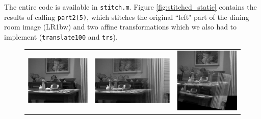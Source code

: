 \documentclass[11pt]{article} %
\begin{document}
The entire code is available in \texttt{stitch.m}. Figure \ref{fig:stitched_static} contains the results of calling \texttt{part2(5)}, which stitches the original ``left" part of the dining room image (LR1bw) and two affine transformations which we also had to implement (\texttt{translate100} and \texttt{trs}).

\begin{figure}[H]
	\centering
	\begin{tabular}{ccc}
		\includegraphics[scale=.4]{LR1bw.png} &
		\includegraphics[scale=.4]{figures/tr100stitching} &
		\includegraphics[scale=.4]{figures/tr_rot_sc_stitching} \\	

\end{tabular}
\end{figure}
\end{document}

